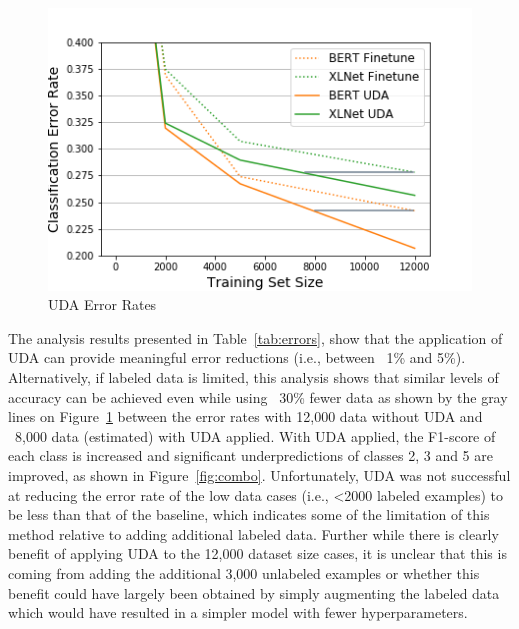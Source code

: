 \documentclass[twoside,twocolumn,10pt]{article}
\begin{document}
\begin{figure}
	\includegraphics[width=\linewidth]{uda_errors.png}
	\caption{UDA Error Rates}
	\label{fig:uda}
\end{figure}

The analysis results presented in Table~\ref{tab:errors}, show that the application of UDA can provide meaningful error reductions (i.e., between ~1\% and 5\%). Alternatively, if labeled data is limited, this analysis shows that similar levels of accuracy can be achieved even while using ~30\% fewer data as shown by the gray lines on Figure~\ref{fig:uda} between the error rates with 12,000 data without UDA and ~8,000 data (estimated) with UDA applied. With UDA applied, the F1-score of each class is increased and significant underpredictions of classes 2, 3 and 5 are improved, as shown in Figure~\ref{fig:combo}. Unfortunately, UDA was not successful at reducing the error rate of the low data cases (i.e., <2000 labeled examples) to be less than that of the baseline, which indicates some of the limitation of this method relative to adding additional labeled data. Further while there is clearly benefit of applying UDA to the 12,000 dataset size cases, it is unclear that this is coming from adding the additional 3,000 unlabeled examples or whether this benefit could have largely been obtained by simply augmenting the labeled data which would have resulted in a simpler model with fewer hyperparameters.
\end{document}
